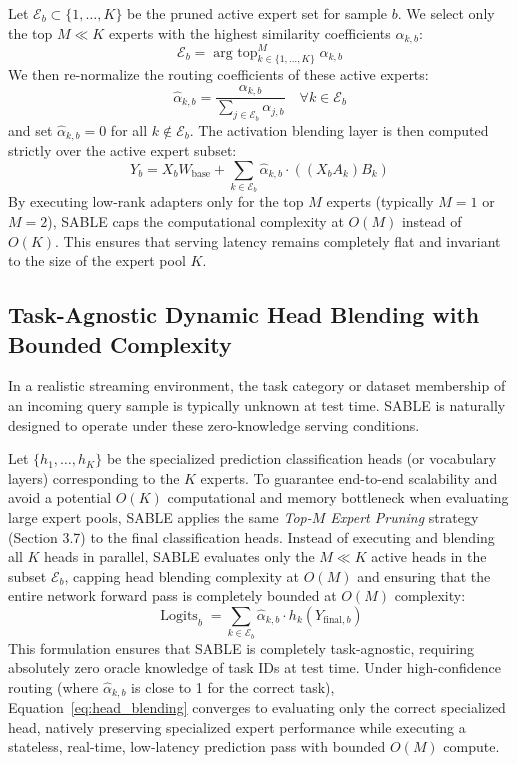 Let $\mathcal{E}_b \subset \{1, \dots, K\}$ be the pruned active expert set for sample $b$. We select only the top $M \ll K$ experts with the highest similarity coefficients $\alpha_{k, b}$:
\begin{equation}
\mathcal{E}_b = \operatorname{arg~top}_{k \in \{1,\dots,K\}}^M \alpha_{k, b}
\label{eq:topm}
\end{equation}
We then re-normalize the routing coefficients of these active experts:
\begin{equation}
\hat{\alpha}_{k, b} = \frac{\alpha_{k, b}}{\sum_{j \in \mathcal{E}_b} \alpha_{j, b}} \quad \forall k \in \mathcal{E}_b
\label{eq:renormalize}
\end{equation}
and set $\hat{\alpha}_{k, b} = 0$ for all $k \notin \mathcal{E}_b$. The activation blending layer is then computed strictly over the active expert subset:
\begin{equation}
Y_b = X_b W_{\text{base}} + \sum_{k \in \mathcal{E}_b} \hat{\alpha}_{k, b} \cdot \left( (X_b A_k) B_k \right)
\label{eq:pruned_blending}
\end{equation}
By executing low-rank adapters only for the top $M$ experts (typically $M=1$ or $M=2$), SABLE caps the computational complexity at $O(M)$ instead of $O(K)$. This ensures that serving latency remains completely flat and invariant to the size of the expert pool $K$.

\subsection{Task-Agnostic Dynamic Head Blending with Bounded Complexity}
In a realistic streaming environment, the task category or dataset membership of an incoming query sample is typically unknown at test time. SABLE is naturally designed to operate under these zero-knowledge serving conditions. 

Let $\{h_1, \dots, h_K\}$ be the specialized prediction classification heads (or vocabulary layers) corresponding to the $K$ experts. To guarantee end-to-end scalability and avoid a potential $O(K)$ computational and memory bottleneck when evaluating large expert pools, SABLE applies the same \emph{Top-$M$ Expert Pruning} strategy (Section 3.7) to the final classification heads. Instead of executing and blending all $K$ heads in parallel, SABLE evaluates only the $M \ll K$ active heads in the subset $\mathcal{E}_b$, capping head blending complexity at $O(M)$ and ensuring that the entire network forward pass is completely bounded at $O(M)$ complexity:
\begin{equation}
\operatorname{Logits}_b = \sum_{k \in \mathcal{E}_b} \hat{\alpha}_{k, b} \cdot h_k\left( Y_{\text{final}, b} \right)
\label{eq:head_blending}
\end{equation}
This formulation ensures that SABLE is completely task-agnostic, requiring absolutely zero oracle knowledge of task IDs at test time. Under high-confidence routing (where $\hat{\alpha}_{k, b}$ is close to 1 for the correct task), Equation~\ref{eq:head_blending} converges to evaluating only the correct specialized head, natively preserving specialized expert performance while executing a stateless, real-time, low-latency prediction pass with bounded $O(M)$ compute.

